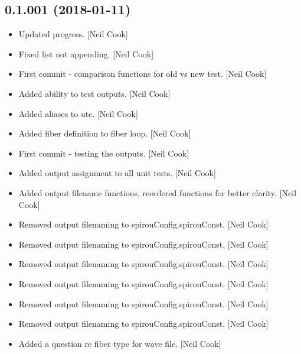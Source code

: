 \documentclass[a4paper,10pt,english]{report}
\begin{document}
\subsection{0.1.001 (2018-01-11)}
\label{\detokenize{misc/changelog:id503}}\begin{itemize}
\item {} 
Updated progress. {[}Neil Cook{]}

\item {} 
Fixed list not appending. {[}Neil Cook{]}

\item {} 
First commit - comparison functions for old vs new test. {[}Neil Cook{]}

\item {} 
Added ability to test outputs. {[}Neil Cook{]}

\item {} 
Added aliases to utc. {[}Neil Cook{]}

\item {} 
Added fiber definition to fiber loop. {[}Neil Cook{]}

\item {} 
First commit  - testing the outputs. {[}Neil Cook{]}

\item {} 
Added output assignment to all unit tests. {[}Neil Cook{]}

\item {} 
Added output filename functions, reordered functions for better
clarity. {[}Neil Cook{]}

\item {} 
Removed output filenaming to spirouConfig.spirouConst. {[}Neil Cook{]}

\item {} 
Removed output filenaming to spirouConfig.spirouConst. {[}Neil Cook{]}

\item {} 
Removed output filenaming to spirouConfig.spirouConst. {[}Neil Cook{]}

\item {} 
Removed output filenaming to spirouConfig.spirouConst. {[}Neil Cook{]}

\item {} 
Removed output filenaming to spirouConfig.spirouConst. {[}Neil Cook{]}

\item {} 
Removed output filenaming to spirouConfig.spirouConst. {[}Neil Cook{]}

\item {} 
Added a question re fiber type for wave file. {[}Neil Cook{]}


\end{itemize}
\end{document}
